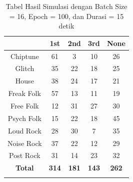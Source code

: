 \begin{longtable}[c]{|c|c|c|c|c|}
	\hline
	\textbf{}      & \textbf{1st} & \textbf{2nd} & \textbf{3rd} & \textbf{None} \\ \hline
	\endfirsthead
	\endhead
	Chiptune       & 61           & 3            & 10           & 26            \\ \hline
	Glitch         & 35           & 22           & 18           & 25            \\ \hline
	House          & 38           & 24           & 17           & 21            \\ \hline
	Freak Folk     & 57           & 13           & 11           & 19            \\ \hline
	Free Folk      & 12           & 31           & 27           & 30            \\ \hline
	Psych Folk     & 15           & 22           & 18           & 45            \\ \hline
	Loud Rock      & 28           & 30           & 7            & 35            \\ \hline
	Noise Rock     & 37           & 22           & 12           & 29            \\ \hline
	Post Rock      & 31           & 14           & 23           & 32            \\ \hline
	\textbf{Total} & \textbf{314} & \textbf{181} & \textbf{143} & \textbf{262}  \\ \hline
	\caption{Tabel Hasil Simulasi dengan Batch Size = 16, Epoch = 100, dan Durasi = 15 detik}
	\label{tab:my-table}\\
\end{longtable}

